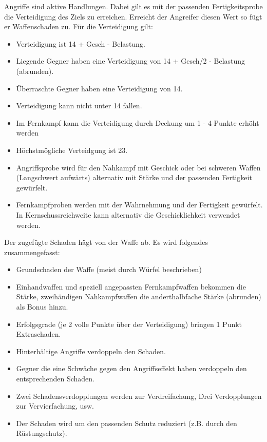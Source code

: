 \documentclass{article}
\begin{document}
Angriffe sind aktive Handlungen. Dabei gilt es mit der passenden Fertigkeitsprobe die Verteidigung des Ziels zu
erreichen. Erreicht der Angreifer diesen Wert so fügt er Waffenschaden zu. Für die Verteidigung gilt:

\begin{itemize}
\item Verteidigung ist 14 + Gesch - Belastung.
\item Liegende Gegner haben eine Verteidigung von 14 + Gesch/2 - Belastung (abrunden).
\item Überraschte Gegner haben eine Verteidigung von 14.
\item Verteidigung kann nicht unter 14 fallen.
\item Im Fernkampf kann die Verteidigung durch Deckung um 1 - 4 Punkte erhöht werden
\item Höchstmögliche Verteidgung ist 23.
\item Angriffsprobe wird für den Nahkampf mit Geschick oder bei schweren Waffen (Langschwert aufwärts) alternativ mit Stärke und der passenden Fertigkeit gewürfelt.
\item Fernkampfproben werden mit der Wahrnehmung und der Fertigkeit gewürfelt. In Kernschussreichweite kann alternativ die Geschicklichkeit verwendet werden.
\end{itemize}

Der zugefügte Schaden hägt von der Waffe ab. Es wird folgendes zusammengefasst:

\begin{itemize}
\item Grundschaden der Waffe (meist durch Würfel beschrieben)
\item Einhandwaffen und speziell angepassten Fernkampfwaffen bekommen die Stärke, zweihändigen Nahkampfwaffen die anderthalbfache Stärke (abrunden) als Bonus hinzu.
\item Erfolgsgrade (je 2 volle Punkte über der Verteidigung) bringen 1 Punkt Extraschaden.
\item Hinterhältige Angriffe verdoppeln den Schaden.
\item Gegner die eine Schwäche gegen den Angriffseffekt haben verdoppeln den entsprechenden Schaden.
\item Zwei Schadensverdopplungen werden zur Verdreifachung, Drei Verdopplungen zur Vervierfachung, usw.
\item Der Schaden wird um den passenden Schutz reduziert (z.B. durch den Rüstungschutz).
\end{itemize}
\end{document}
